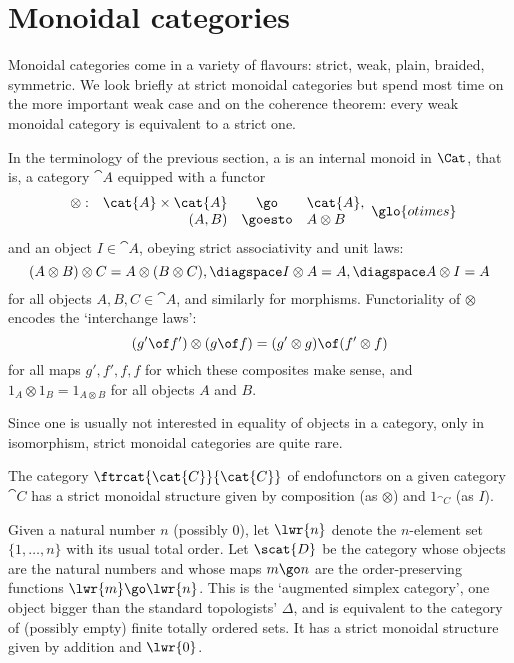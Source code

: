 \section{Monoidal categories}


Monoidal categories come in a variety of flavours: strict, weak, plain,
braided, symmetric.  We look briefly at strict monoidal categories but
spend most time on the more important weak case and on the coherence
theorem: every weak monoidal category is equivalent to a strict one.

In the terminology of the previous section, a  is an internal monoid in $\Cat$, that is, a category $\cat{A}$
equipped with a functor
\[
\begin{array}{rrcl}
\otimes:	&\cat{A} \times \cat{A}	&\go		&\cat{A},	\\
		&(A, B)			&\goesto	&A\otimes B
\end{array}%
% 
\glo{otimes}
%
\]
and an object $I\in \cat{A}$,%
% 
%
obeying strict associativity and unit laws:
\[
(A\otimes B)\otimes C 
=
A\otimes (B\otimes C),
\diagspace
I\otimes A
=
A,
\diagspace
A\otimes I
= 
A
\]
for all objects $A, B, C \in \cat{A}$, and similarly for morphisms.
Functoriality of $\otimes$ encodes the `interchange%
%
%
laws':
% 
\begin{equation}	\label{eq:mon-interchange}
(g' \of f') \otimes (g \of f)
=
(g' \otimes g) \of (f' \otimes f)
\end{equation}
% 
for all maps $g', f', f, f$ for which these composites make sense, and $1_A
\otimes 1_B = 1_{A \otimes B}$ for all objects $A$ and $B$.

Since one is usually not interested in equality of objects in a category,
only in isomorphism, strict monoidal categories are quite rare.

\begin{example}	
The category $\ftrcat{\cat{C}}{\cat{C}}$ of endofunctors on a given
category $\cat{C}$ has a strict monoidal structure given by composition (as
$\otimes$) and 
$1_{\cat{C}}$ (as $I$).
\end{example}

\begin{example}	
Given a natural number $n$ (possibly $0$), let $\lwr{n}$%
% 
%
denote the
$n$-element set $\{1, \ldots, n\}$ with its usual total order.  Let
$\scat{D}$%
% 
%
be the category whose objects are the natural numbers and whose maps $m\go
n$ are the order-preserving functions $\lwr{m} \go \lwr{n}$.  This is the
`augmented simplex category', one object bigger than the standard
topologists' $\Delta$, and is equivalent to the category of (possibly
empty) finite totally ordered sets.  It has a strict monoidal structure
given by addition and $\lwr{0}$.
\end{example}

